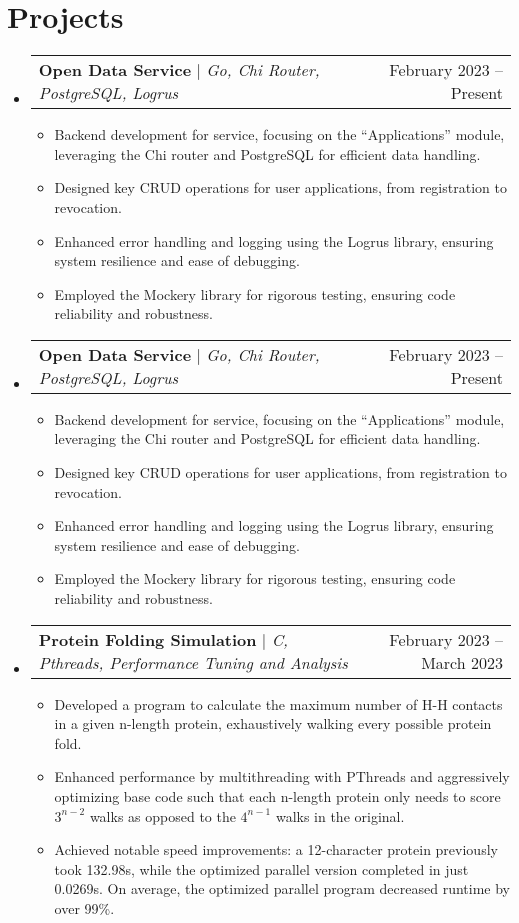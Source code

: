 \documentclass[letterpaper,11pt]{article}
\makeatletter
\newcommand{\resumeItem}[1]{
  \item\small{
    {#1 \vspace{-2pt}}
  }
}
\newcommand{\resumeProjectHeading}[2]{
    \item
    \begin{tabular*}{0.97\textwidth}{l@{\extracolsep{\fill}}r}
      \small#1 & #2 \\
    \end{tabular*}\vspace{-7pt}
}
\newcommand{\resumeSubHeadingListStart}{\begin{itemize}[leftmargin=0.15in, label={}]}
\newcommand{\resumeSubHeadingListEnd}{\end{itemize}}
\newcommand{\resumeItemListStart}{\begin{itemize}}
\newcommand{\resumeItemListEnd}{\end{itemize}\vspace{-5pt}}
\makeatother
\begin{document}
\section{Projects}
    \resumeSubHeadingListStart
      \resumeProjectHeading
          {\textbf{Open Data Service} $|$ \emph{Go, Chi Router, PostgreSQL, Logrus}}{February 2023 -- Present}
          \resumeItemListStart
            \resumeItem{Backend development for service, focusing on the ``Applications'' module, leveraging the Chi router and PostgreSQL for efficient data handling.}
            \resumeItem{Designed key CRUD operations for user applications, from registration to revocation.}
            \resumeItem{Enhanced error handling and logging using the Logrus library, ensuring system resilience and ease of debugging.}
            \resumeItem{Employed the Mockery library for rigorous testing, ensuring code reliability and robustness.}
          \resumeItemListEnd
      \resumeProjectHeading
          {\textbf{Open Data Service} $|$ \emph{Go, Chi Router, PostgreSQL, Logrus}}{February 2023 -- Present}
          \resumeItemListStart
            \resumeItem{Backend development for service, focusing on the ``Applications'' module, leveraging the Chi router and PostgreSQL for efficient data handling.}
            \resumeItem{Designed key CRUD operations for user applications, from registration to revocation.}
            \resumeItem{Enhanced error handling and logging using the Logrus library, ensuring system resilience and ease of debugging.}
            \resumeItem{Employed the Mockery library for rigorous testing, ensuring code reliability and robustness.}
          \resumeItemListEnd
      \resumeProjectHeading
          {\textbf{Protein Folding Simulation} $|$ \emph{C, Pthreads, Performance Tuning and Analysis}}{February 2023 -- March 2023}
          \resumeItemListStart
            \resumeItem{Developed a program to calculate the maximum number of H-H contacts in a given n-length protein, exhaustively walking every possible protein fold.}
            \resumeItem{Enhanced performance by multithreading with PThreads and aggressively optimizing base code such that each n-length protein only needs to score $3^{n-2}$ walks as opposed to the $4^{n-1}$ walks in the original.}
            \resumeItem{Achieved notable speed improvements: a 12-character protein previously took 132.98s, while the optimized parallel version completed in just 0.0269s. On average, the optimized parallel program decreased runtime by over 99\%.}
          \resumeItemListEnd
    \resumeSubHeadingListEnd



%



\end{document}
